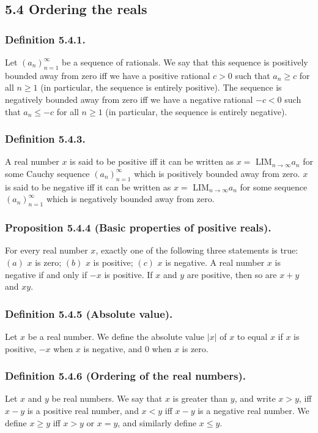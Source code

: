 \documentclass[12pt, letter]{article}
\newcommand{\an}{$(a_n)_{n=1}^\infty$ }
\newcommand{\la}{LIM$_{n\to\infty}a_n$  }
\begin{document}
\subsection*{5.4 Ordering the reals}
\subsubsection*{Definition 5.4.1.}
Let \an be a sequence of rationals. We say that this sequence is positively bounded away from zero iff we have a positive rational $c>0$ such that $a_n\geq c$ for all $n\geq 1$ (in particular, 
the sequence is entirely positive). The sequence is negatively bounded away from zero iff we have a negative rational $-c<0$ such that $a_n\leq -c$ for all $n\geq 1$ (in particular, 
the sequence is entirely negative).
\subsubsection*{Definition 5.4.3.}
A real number $x$ is said to be positive iff it can be written as $x=$ \la for some Cauchy sequence \an which is positively bounded away from zero. $x$ is said to be 
negative iff it can be written as $x=$ \la for some sequence \an which is negatively bounded away from zero.
\subsubsection*{Proposition 5.4.4 (Basic properties of positive reals).}
For every real number $x$, exactly one of the following three statements is true: $(a)$ $x$ is zero; $(b)$ $x$ is positive; $(c)$ $x$ is negative. A real number $x$ is negative if and 
only if $-x$ is positive. If $x$ and $y$ are positive, then so are $x+y$ and $xy$.
\subsubsection*{Definition 5.4.5 (Absolute value).}
Let $x$ be a real number. We define the absolute value $|x|$ of $x$ to equal $x$ if $x$ is positive, $-x$ when $x$ is negative, and $0$ when $x$ is zero.
\subsubsection*{Definition 5.4.6 (Ordering of the real numbers).}
Let $x$ and $y$ be real numbers. We say that $x$ is greater than $y$, and write $x>y$, iff $x-y$ is a positive real number, and $x<y$ iff $x-y$ is a negative real number.
We define $x\geq y$ iff $x>y$ or $x=y$, and similarly define $x\leq y$.
\end{document}
